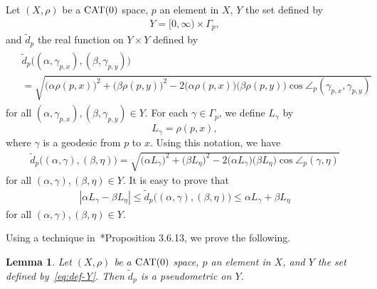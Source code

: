 \documentclass[draft]{amsart}
\numberwithin{equation}{section}
\providecommand{\abs}[1]{\left\lvert#1\right\rvert}
\newcommand{\CAT}{\textup{CAT}}
\theoremstyle{plain}
\newtheorem{lemma}[theorem]{Lemma}
\theoremstyle{definition}
\theoremstyle{remark}
\begin{document}
Let $(X, \rho)$ be a $\CAT(0)$ space, 
$p$ an element in $X$, $Y$ the set defined by 
\begin{align}\label{eq:def-Y}
 Y=[0,\infty)\times \Gamma_p, 
\end{align}
and $\tilde{d}_p$ the real function on $Y\times Y$ 
defined by 
\begin{align}
 \begin{split}\label{eq:def-d_p}
 &\tilde{d}_p\bigl((\alpha, \gamma_{p,x}), (\beta, \gamma_{p,y})\bigr) \\
 &=\sqrt{\bigl(\alpha \rho(p,x)\bigr)^2 
 +\bigl(\beta \rho(p,y)\bigr)^2 
 -2\bigl(\alpha \rho(p,x)\bigr)\bigl(\beta \rho(p,y)\bigr)
 \cos \angle_p(\gamma_{p,x}, \gamma_{p,y})}  
 \end{split}
\end{align}
for all $(\alpha, \gamma_{p,x}), (\beta, \gamma_{p,y})\in Y$. 
For each $\gamma \in \Gamma_p$, we define $L_{\gamma}$ by 
\[
 L_{\gamma} = \rho (p, x), 
\]
where $\gamma$ is a geodesic from $p$ to $x$. 
Using this notation, we have 
\begin{align}\label{eq:def-d_p-L}
 \tilde{d}_p\bigl((\alpha, \gamma), (\beta, \eta)\bigr) 
 =\sqrt{\bigl(\alpha L_{\gamma}\bigr)^2 
 +\bigl(\beta L_{\eta}\bigr)^2 
 -2\bigl(\alpha L_{\gamma}\bigr)\bigl(\beta L_{\eta}\bigr) \cos \angle_p(\gamma, \eta)}  
\end{align}
for all $(\alpha, \gamma), (\beta, \eta)\in Y$. 
It is easy to prove that 
\begin{align}\label{eq:ineq-d_p}
 \abs{\alpha L_{\gamma} - \beta L_{\eta}} 
 \leq \tilde{d}_p\bigl((\alpha, \gamma), (\beta, \eta)\bigr) 
 \leq \alpha L_{\gamma} + \beta L_{\eta}
\end{align}
for all $(\alpha, \gamma), (\beta, \eta) \in Y$. 

Using a technique in~\cite{MR1835418}*{Proposition 3.6.13}, 
we prove the following. 

\begin{lemma}\label{lem:d_p-pm}
 Let $(X, \rho)$ be a $\CAT(0)$ space, 
 $p$ an element in $X$, and $Y$ the set defined by~\eqref{eq:def-Y}. 
 Then $\tilde{d}_p$ is a pseudometric 
 on $Y$. 
\end{lemma}
\end{document}
